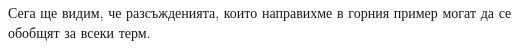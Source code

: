 \begin{example}
\end{example}




Сега ще видим, че разсъжденията, които направихме в горния пример могат да се обобщят за всеки терм.

